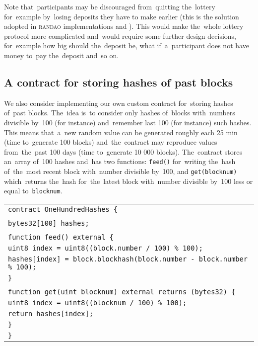 \documentclass[a4paper]{article}
\newcommand{\randao}{\textsc{randao}}
\begin{document}
    Note that~participants may be discouraged from~quitting the~lottery for~example by~losing deposits they have to
    make earlier (this is the solution adopted in \randao{} implementations \cite{RANDAO} and \cite{RANDAO2}).
    This would make the~whole lottery protocol more complicated and~would require some further design
    decisions, for~example how big should the~deposit be, what if~a~participant does not have money to~pay the~deposit
    and~so on.

    \subsection{A contract for storing hashes of past blocks}
    We also consider implementing our own custom contract for~storing hashes of~past blocks.
    The~idea is~to consider only hashes of~blocks with~numbers divisible by~100 (for instance) and~remember last 100
    (for instance) such hashes. This means that~a~new random value can be generated roughly each 25 min
    (time to~generate 100 blocks) and~the~contract may reproduce values from~the~past 100 days
    (time to~generate 10 000 blocks). The~contract stores an~array of~100 hashes and~has two functions:
    \texttt{feed()} for~writing the~hash of~the~most recent block with~number divisible by~100, and
    \texttt{get(blocknum)} which~returns the~hash for~the~latest block with~number divisible by~100 less or
    equal to~\texttt{blocknum}.

    \label{sec:hundred}

    \begin{tabular}{l}
        \texttt{contract OneHundredHashes \{}\\
        \\
	    \qquad \texttt{bytes32[100] hashes;}\\
        \\
	    \qquad\texttt{function feed() external \{}\\
    	\qquad\qquad \texttt{uint8 index = uint8((block.number / 100) \% 100);}\\
    	\qquad\qquad \texttt{hashes[index] = block.blockhash(block.number - block.number \% 100);}\\
	    \qquad\texttt{\}}\\
        \\
	    \qquad \texttt{function get(uint blocknum) external returns (bytes32) \{}\\
        \qquad\qquad \texttt{uint8 index = uint8((blocknum / 100) \% 100);}\\
    	\qquad\qquad \texttt{return hashes[index];}\\
	    \qquad\texttt{\}}\\
    \texttt{\}}
    \end{tabular}
\end{document}
